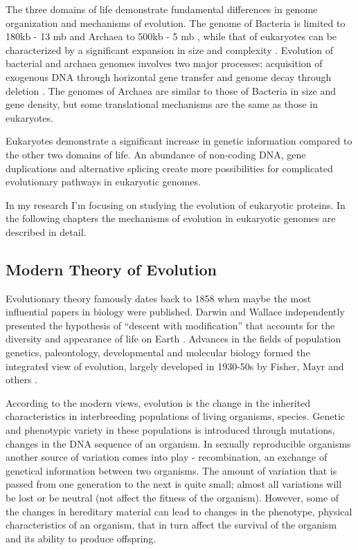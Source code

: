 \documentclass[11pt, a4paper,oneside]{report}
\begin{document}
The three domains of life demonstrate fundamental differences in genome organization and mechanisms of evolution. The genome of Bacteria is limited to 180kb - 13 mb and Archaea to 500kb - 5 mb \cite{Koonin2008}, while that of eukaryotes can be characterized by a significant expansion in size and complexity \cite{Gregory2007, Parfrey2008}. Evolution of bacterial and archaea genomes involves two major processes: acquisition of exogenous DNA through horizontal gene transfer and genome decay through deletion \cite{Pal2005}. The genomes of Archaea are similar to those of Bacteria in size and gene density, but some translational mechanisms are the same as those in eukaryotes.

 Eukaryotes demonstrate a significant increase in genetic information compared to the other two domains of life. An abundance of non-coding DNA, gene duplications and alternative splicing create more possibilities for complicated evolutionary pathways in eukaryotic genomes.
 
  In my research I'm focusing on studying the evolution of eukaryotic proteins. In the following chapters the mechanisms of evolution in eukaryotic genomes are described in detail.
  
\subsection{Modern Theory of Evolution}
Evolutionary theory famously dates back to 1858 when maybe the most influential papers in biology were published. 
Darwin and Wallace independently presented the hypothesis of “descent with modification” that accounts for the diversity 
and appearance of life on Earth \cite{Wallace1912}. Advances in the fields of population genetics, paleontology, developmental and 
molecular biology formed the integrated view of evolution, largely developed in 1930-50s by Fisher, Mayr and others \cite{MAYR1963,Grant1980,Kutschera2004}. 

According to the modern views, evolution is the change in the inherited characteristics in interbreeding populations of 
living organisms, species. Genetic and phenotypic variety in these populations is introduced through mutations, changes in the DNA sequence of an organism. In sexually reproducible organisms another source of variation comes into play - recombination, an exchange of genetical information between two organisms. The amount of variation that is passed from one generation to the next is quite small; almost all variations will be lost or be neutral (not affect the fitness of the organism). However, some of the changes in hereditary material can lead to changes in the phenotype, physical characteristics of an organism, that in turn affect the survival of the organism and its ability to produce offspring. 
\end{document}
